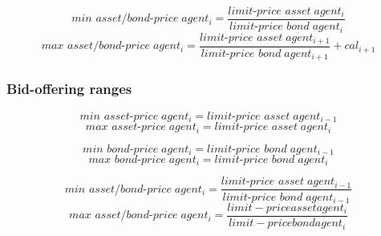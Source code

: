 \documentclass[Bachelorarbeit.tex]{subfiles}
\begin{document}
\begin{equation}
\textit{min asset/bond-price} \; agent_{i} = \frac{\textit{limit-price asset} \; agent_{i}}{\textit{limit-price bond} \; agent_{i}}
\end{equation}
\begin{equation}
\textit{max asset/bond-price} \; agent_{i} = \frac{\textit{limit-price asset} \; agent_{i+1}}{\textit{limit-price bond} \; agent_{i+1}} + cal_{i+1}
\end{equation}

\subsubsection{Bid-offering ranges}
\begin{equation}
\textit{min asset-price} \; agent_{i} = \textit{limit-price asset} \; agent_{i - 1}
\end{equation}
\begin{equation}
\textit{max asset-price} \; agent_{i} = \textit{limit-price asset} \; agent_{i}
\end{equation}

\begin{equation}
\textit{min bond-price} \; agent_{i} = \textit{limit-price bond} \; agent_{i - 1}
\end{equation}
\begin{equation}
\textit{max bond-price} \; agent_{i} = \textit{limit-price bond} \; agent_{i}
\end{equation}

\begin{equation}
\textit{min asset/bond-price} \; agent_{i} = \frac{\textit{limit-price asset} \; agent_{i - 1}}{\textit{limit-price bond} \; agent_{i - 1}}
\end{equation}
\begin{equation}
\textit{max asset/bond-price} \; agent_{i} = \frac{limit-price asset agent_{i}}{limit-price bond agent_{i}}
\end{equation}
\end{document}
